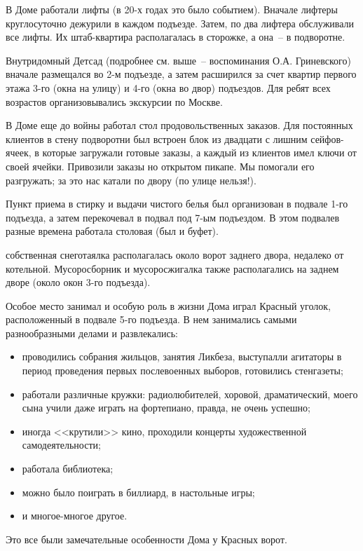 В Доме работали лифты (в 20-х годах это было событием). Вначале лифтеры круглосуточно дежурили в каждом подъезде. Затем, по два лифтера обслуживали все лифты. Их штаб-квартира располагалась в сторожке, а она~-- в подворотне.

Внутридомный Детсад (подробнее см. выше~-- воспоминания О.А. Гриневского) вначале размещался во 2-м подъезде, а затем  расширился за счет квартир первого этажа 3-го (окна на улицу) и 4-го (окна во двор) подъездов. Для ребят всех возрастов организовывались экскурсии по Москве.

В Доме еще до войны работал стол продовольственных заказов. Для постоянных клиентов в стену подворотни был встроен блок из двадцати с лишним сейфов-ячеек, в которые загружали готовые заказы, а каждый из клиентов имел ключи от своей ячейки. Привозили заказы но открытом пикапе. Мы помогали его разгружать; за это нас катали по двору (по улице нельзя!).

Пункт приема в стирку и выдачи чистого белья был организован в подвале 1-го подъезда, а затем перекочевал в подвал под 7-ым подъездом. В этом подвалев разные времена работала столовая (был и буфет).

собственная снеготаялка располагалась около ворот заднего двора, недалеко от котельной. Мусоросборник и мусоросжигалка также располагались на заднем дворе (около окон 3-го подъезда).

Особое место занимал и особую роль в жизни Дома играл Красный уголок, расположенный в подвале 5-го подъезда. В нем занимались самыми разнообразными делами и развлекались:

\begin{itemize}
\item проводились собрания жильцов, занятия Ликбеза, выступалли агитаторы в период проведения первых послевоенных выборов, готовились стенгазеты;
\item работали различные кружки: радиолюбителей, хоровой, драматический, моего сына учили даже играть на фортепиано, правда, не очень успешно;
\item иногда <<крутили>> кино, проходили концерты художественной самодеятельности;
\item работала библиотека;
\item можно было поиграть в биллиард, в настольные игры;
\item и многое-многое другое.
\end{itemize}

Это все были замечательные особенности Дома у Красных ворот.

